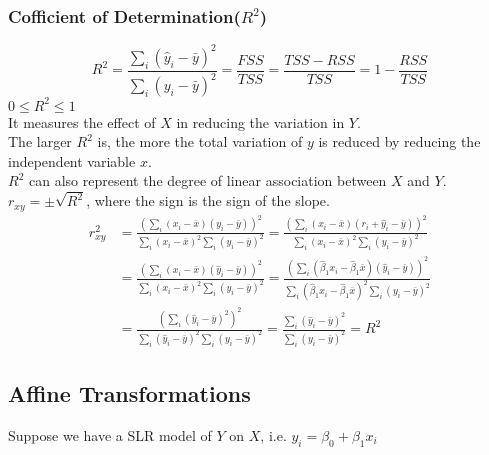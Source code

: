 \documentclass[11pt,a4paper]{article}
\begin{document}
\subsubsection{Cofficient of Determination($R^2$)}
$$R^{2}=\frac{\sum_{i}\left(\hat{y}_{i}-\bar{y}\right)^{2}}{\sum_{i}\left(y_{i}-\bar{y}\right)^{2}}=\frac{F S S}{T S S}=\frac{T S S-R S S}{T S S}=1-\frac{R S S}{T S S}$$
$0\leq R^2\leq 1$\\
It measures the effect of $X$ in reducing the variation in $Y$.\\
The larger $R^2$ is, the more the total variation of $y$ is reduced by reducing the independent variable $x$.\\

$R^2$ can also represent the degree of linear association between $X$ and $Y$.\\
$r_{xy}= \pm \sqrt{R^2}$, where the sign is the sign of the slope.
\begin{equation}
    \begin{aligned}
       r_{xy}^2
       &=\frac{(\sum_{i}\left(x_{i}-\bar{x}\right)\left(y_{i}-\bar{y}\right))^2}{\sum_{i}\left(x_{i}-\bar{x}\right)^{2}\sum_{i}\left(y_{i}-\bar{y}\right)^{2}}=\frac{(\sum_{i}\left(x_{i}-\bar{x}\right)\left(r_i+\hat{y}_{i}-\bar{y}\right))^2}{\sum_{i}\left(x_{i}-\bar{x}\right)^{2}\sum_{i}\left(y_{i}-\bar{y}\right)^{2}}\\
       &=\frac{(\sum_{i}\left(x_{i}-\bar{x}\right)\left(\hat{y}_{i}-\bar{y}\right))^2}{\sum_{i}\left(x_{i}-\bar{x}\right)^{2}\sum_{i}\left(y_{i}-\bar{y}\right)^{2}}=\frac{(\sum_{i}\left(\hat{\beta}_1 x_{i}-\hat{\beta}_1 \bar{x}\right)\left(\hat{y}_{i}-\bar{y}\right))^2}{\sum_{i}\left(\hat{\beta}_1 x_{i}-\hat{\beta}_1 \bar{x}\right)^{2}\sum_{i}\left(y_{i}-\bar{y}\right)^{2}}\\
       &=\frac{(\sum_{i}\left(\hat{y}_{i}-\bar{y}\right)^2)^2}{\sum_{i}\left(\hat{y}_{i}-\bar{y}\right)^{2}\sum_{i}\left(y_{i}-\bar{y}\right)^{2}}=\frac{\sum_{i}\left(\hat{y}_{i}-\bar{y}\right)^{2}}{\sum_{i}\left(y_{i}-\bar{y}\right)^{2}}=R^2
    \end{aligned}
    \nonumber
\end{equation}

\subsection{Affine Transformations}
Suppose we have a SLR model of $Y$ on $X$, i.e. $y_i=\beta_0+\beta_1x_i$\\
\end{document}
